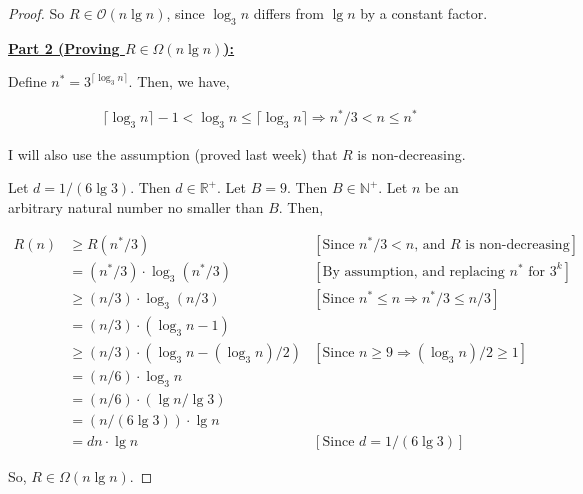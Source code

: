 \documentclass[12pt]{article}
\begin{document}
\begin{itemize}
\begin{proof}
    \bigskip

    So $R \in \mathcal{O}(n \lg n)$, since $\log_3 n$ differs from $\lg n$ by a constant factor.

    \bigskip

    \underline{\textbf{Part 2 (Proving $R \in \Omega(n \lg n)$):}}

    \bigskip

    Define $n^* = 3^{\lceil \log_3 n \rceil}$. Then, we have,

    \begin{align}
        \lceil \log_3 n \rceil - 1 < \log_3 n \leq \lceil \log_3 n \rceil \Rightarrow n^*/3 < n \leq n^*
    \end{align}

    I will also use the assumption (proved last week) that $R$ is non-decreasing.

    \bigskip

    Let $d = 1/(6\lg 3)$. Then $d \in \mathbb{R}^+$. Let $B = 9$. Then $B \in \mathbb{N}^+$. Let
    $n$ be an arbitrary natural number no smaller than $B$. Then,

    \begin{align}
    R(n) &\geq R(n^*/3) & [\text{Since $n^*/3 < n$, and $R$ is non-decreasing}]\\
    &= (n^*/3) \cdot \log_3 (n^*/3) & [\text{By assumption, and replacing $n^*$ for $3^k$}]\\
    &\geq (n/3) \cdot \log_3 (n/3) & [\text{Since $n^* \leq n \Rightarrow n^*/3 \leq n/3$}]\\
    &= (n/3) \cdot (\log_3 n - 1)\\
    &\geq (n/3) \cdot (\log_3 n - (\log_3 n)/2) & [\text{Since $n \geq 9 \Rightarrow (\log_3 n)/2 \geq 1$}]\\
    &= (n/6) \cdot \log_3 n\\
    &= (n/6) \cdot (\lg n/\lg 3)\\
    &= (n/(6\lg 3)) \cdot \lg n\\
    &= dn \cdot \lg n & [\text{Since $d = 1/(6\lg 3)$}]
    \end{align}

    So, $R \in \Omega(n \lg n)$.

    \end{proof}

\end{itemize}


\end{document}
